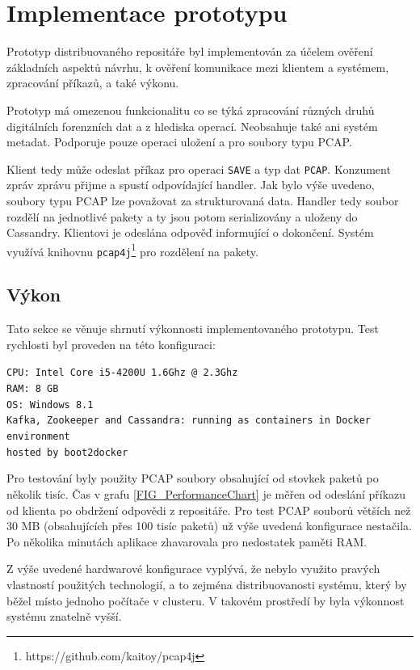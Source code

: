 \chapter{Implementace prototypu} \label{chapterPrototype}
Prototyp distribuovaného repositáře byl implementován za účelem ověření základních aspektů návrhu, k ověření komunikace mezi klientem a systémem, zpracování příkazů, a také výkonu.

Prototyp má omezenou funkcionalitu co se týká zpracování různých druhů digitálních forenzních dat a z hlediska operací. Neobsahuje také ani systém metadat. Podporuje pouze operaci uložení a pro soubory typu PCAP.

Klient tedy může odeslat příkaz pro operaci \texttt{SAVE} a typ dat \texttt{PCAP}. Konzument zpráv zprávu přijme a spustí odpovídající handler. Jak bylo výše uvedeno, soubory typu PCAP lze považovat za strukturovaná data. Handler tedy soubor rozdělí na jednotlivé pakety a ty jsou potom serializovány a uloženy do Cassandry. Klientovi je odeslána odpověď informující o dokončení. Systém využívá knihovnu \texttt{pcap4j}\footnote{https://github.com/kaitoy/pcap4j} pro rozdělení na pakety.

\section{Výkon}
Tato sekce se věnuje shrnutí výkonnosti implementovaného prototypu. Test rychlosti byl proveden na této konfiguraci:

\vspace{0.5cm}
\noindent
\texttt{CPU: Intel Core i5-4200U 1.6Ghz @ 2.3Ghz} \\
\texttt{RAM: 8 GB} \\
\texttt{OS: Windows 8.1} \\
\texttt{Kafka, Zookeeper and Cassandra: running as containers in Docker environment} \\
\texttt{hosted by boot2docker}

\vspace{0.5cm}
\noindent
Pro testování byly použity PCAP soubory obsahující od stovkek paketů po několik tisíc. Čas v grafu \ref{FIG_PerformanceChart} je měřen od odeslání příkazu od klienta po obdržení odpovědi z repositáře. Pro test PCAP souborů větších než 30 MB (obsahujících přes 100 tisíc paketů) už výše uvedená konfigurace nestačila. Po několika minutách aplikace zhavarovala pro nedostatek paměti RAM.

Z výše uvedené hardwarové konfigurace vyplývá, že nebylo využito pravých vlastností použitých technologií, a to zejména distribuovanosti systému, který by běžel místo jednoho počítače v clusteru. V takovém prostředí by byla výkonnost systému znatelně vyšší.

